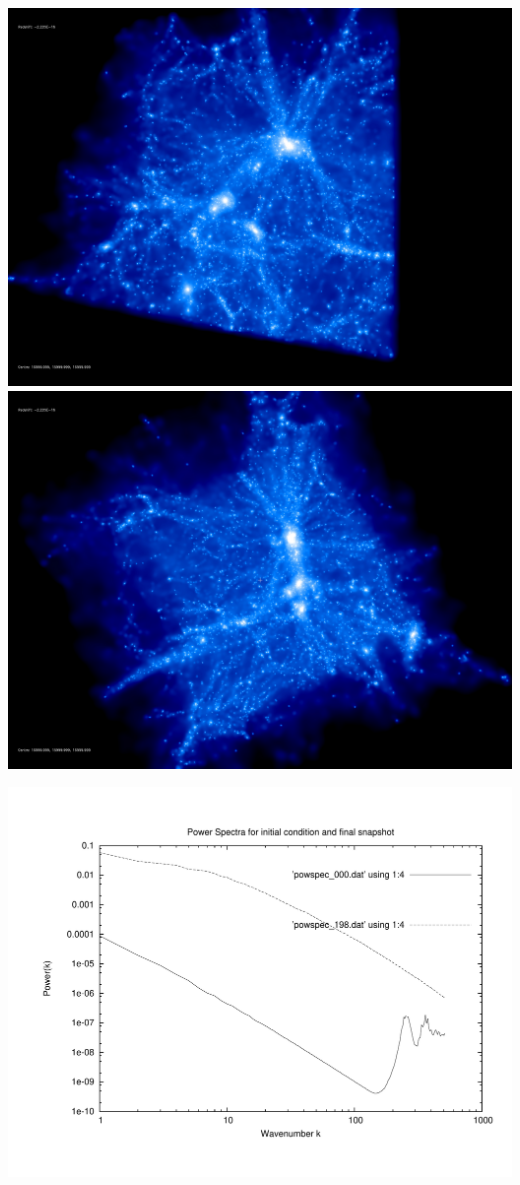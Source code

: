 \includegraphics[scale=0.1]{stages_14/rotate_00074.jpg} 
\includegraphics[scale=0.1]{stages_14/rotate_00131.jpg}

\includegraphics[scale=0.5]{stages_14/plot_powspec_stages_14}

